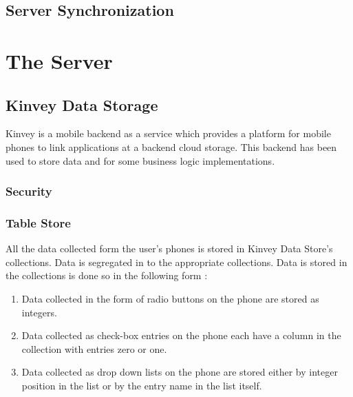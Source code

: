 \subsection{Server Synchronization}

\section{The Server}

\subsection{Kinvey Data Storage}

Kinvey is a mobile backend as a service which provides a platform for mobile phones to link applications at a backend cloud storage. This backend has been used to store data and for some business logic implementations.
\subsubsection{Security}

\subsubsection{Table Store}
All the data collected form the user's phones is stored in Kinvey Data Store's collections. Data is segregated in to the appropriate collections. Data is stored in the collections is done so in the following form :

\begin{enumerate}
    \item Data collected in the form of radio buttons on the phone are stored as integers.
    \item Data collected as check-box entries on the phone each have a column in the collection with entries zero or one.
    \item Data collected as drop down lists on the phone are stored either by integer position in the list or by the entry name in the list itself.
\end{enumerate}

